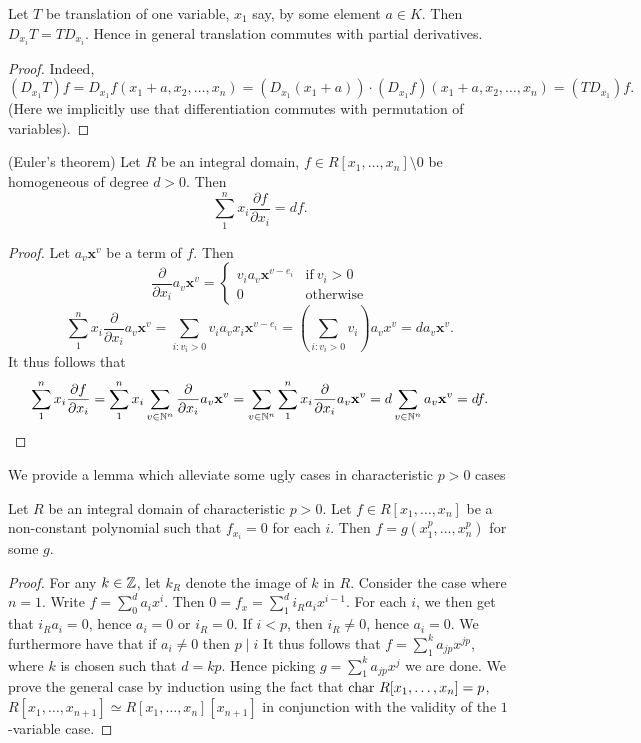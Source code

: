 \begin{lemma}\label{TranslationAndPartialDerivativesCommute}
    Let $T$ be translation of one variable, $x_1$ say, by some element $a\in K$. Then $D_{x_{i}}T=TD_{x_i}$. Hence in general translation commutes with partial derivatives.  
\end{lemma}
\begin{proof}
    Indeed,  
    $$(D_{x_1}T)f = D_{x_1}f(x_1+a,x_2,\dots,x_n) = (D_{x_1}(x_1+a))\cdot (D_{x_1}f)(x_1+a,x_2,\dots,x_n) =(TD_{x_1})f.$$
    (Here we implicitly use that differentiation commutes with permutation of variables).
\end{proof}
\begin{lemma}\label{EulersTheorem}(Euler's theorem)
    Let $R$ be an integral domain, $f\in R[x_1,\dots,x_n]\setminus0 $ be homogeneous of degree $d>0$. Then
    $$\sum_1^n x_i\frac{\partial f}{\partial x_i}=df.$$
\end{lemma}
\begin{proof}
    Let $a_v\mathbf{x}^v$ be a term of $f$. Then
    $$\frac{\partial }{\partial x_i} a_v\mathbf{x}^v = \begin{cases}
        v_ia_v\mathbf{x}^{v-e_i} & \mathrm{if} \ v_i>0\\
        0 & \mathrm{otherwise}
    \end{cases}$$
    $$\sum_1^n x_i\frac{\partial }{\partial x_i} a_v\mathbf{x}^v = \sum_{i: v_i>0} v_ia_vx_i \mathbf{x}^{v-e_i} = \left(\sum_{i : v_i>0} v_i\right) a_vx^{v} = da_v\mathbf{x}^v.$$
    It thus follows that 
    $$\sum_1^n x_i\frac{\partial f}{\partial x_i}= \sum_1^n x_i\sum_{v\in\mathbb{N}^n}\frac{\partial}{\partial x_i}a_v\mathbf{x}^v = \sum_{v\in\mathbb{N}^n} \sum_1^n x_i\frac{\partial}{\partial x_i}a_v\mathbf{x}^v=d\sum_{v\in\mathbb{N}^n} a_v\mathbf{x}^v=d f. $$
\end{proof}
We provide a lemma which alleviate some ugly cases in characteristic $p>0$ cases
\begin{lemma}\label{UsefulPartialDerivativeLemmaForPositiveCharacteristic}
    Let $R$ be an integral domain of characteristic $p>0$. Let $f\in R[x_1,\dots,x_n]$ be a non-constant polynomial such that $f_{x_i}=0$ for each $i$. Then $f=g(x_1^p,\dots,x_n^p)$ for some $g$. 
\end{lemma}
\begin{proof}
    For any $k\in \mathbb{Z}$, let $k_R$ denote the image of $k$ in $R$. Consider the case where $n=1$. Write $f=\sum_0^d a_ix^i$. Then $0=f_x = \sum_1^{d} i_Ra_ix^{i-1}.$ For each $i$, we then get that $i_Ra_i=0$, hence $a_i=0$ or $i_R=0$. If $i < p$, then $i_R\neq 0$, hence $a_i =0$. We furthermore have that if $a_i\neq 0$ then $p\mid i$ It thus follows that $f = \sum_{1}^k a_{jp} x^{jp}$, where $k$ is chosen such that $d = kp$. Hence picking $g = \sum_1^k a_{jp} x^{j}$ we are done. We prove the general case by induction using the fact that $\mathrm{char}\ R[x_1,\dots,x_n] = p$, $R[x_1,\dots,x_{n+1}]\simeq R[x_1,\dots,x_n][x_{n+1}]$ in conjunction with the validity of the $1$-variable case.   
\end{proof}
